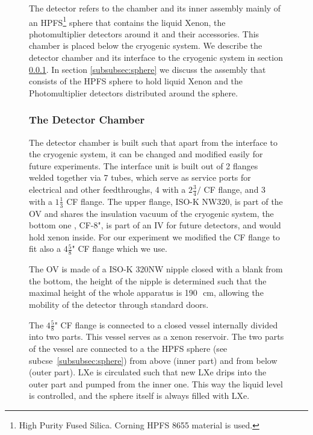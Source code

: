 \begin{figure}[h]
The detector refers to the chamber and its inner assembly  
mainly {of} an HPFS\footnote{High Purity Fused Silica. Corning HPFS 8655 material is used.} sphere that 
contains the liquid Xenon, the photomultiplier detectors around it and their accessories. 
This chamber is placed below the cryogenic system.  
We describe the detector chamber and its interface to the cryogenic system in 
section \ref{subsubsec:detchamber}. In section \ref{subsubsec:sphere} we discuss the assembly 
that consists of the HPFS sphere to hold liquid Xenon and the Photomultiplier detectors distributed 
around the sphere.
\subsubsection{The Detector Chamber}
\label{subsubsec:detchamber}

The detector chamber is built  such  that apart from the interface to the cryogenic system, it can 
be changed and modified easily for future experiments. The interface unit is built out of 2 flanges 
welded together via 7 tubes, which serve as service ports for electrical and other feedthroughs, 4 
with a $2 \frac{3}{4}/$ CF flange, and 3 with a $1\frac{1}{3}$ CF flange. 
The upper flange, ISO-K NW320, is part of the OV and shares the insulation vacuum of the cryogenic 
system, the bottom one , CF-8", is part of an IV for future detectors, and would hold xenon inside. 
For our experiment we modified the CF flange to fit also a $4\frac{5}{8}$" CF 
flange which we use.

The OV is made of a ISO-K 320NW nipple closed with a blank from the bottom, 
the height of the nipple is determined such that the maximal height of the whole 
apparatus is 190~\,cm, allowing the mobility of the detector through standard doors.
 
The $4\frac{5}{8}$" CF flange is connected to a closed vessel internally divided into 
two parts. This vessel serves as a xenon reservoir. The two parts of the vessel are connected 
to a the HPFS sphere (see subcse~\ref{subsubsec:sphere}) from above (inner part) and from below 
(outer part). LXe is circulated such that new LXe drips into the outer part and pumped from the 
inner one. This way the liquid level is controlled, and the sphere itself is always filled with LXe. 




\end{figure}
